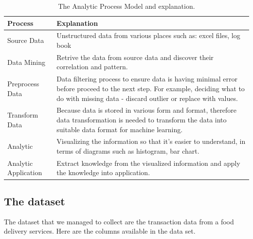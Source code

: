 \documentclass[journal]{IEEEtran}
\begin{document}
\begin{table}[!ht]
	\renewcommand{\arraystretch}{1.3}
	\setlength\extrarowheight{2.5pt}
	\caption{The Analytic Process Model and explanation.}
	\label{Analytic Proces Model}
	\centering	
\begin{tabular}{|l|>{\raggedright\arraybackslash}p{5cm}|}
	\hline 
	Process & Explanation \\ 
	\hline 
	Source Data & Unstructured data from various places such as: excel files, log book \\ 
	\hline 
	Data Mining & Retrive the data from source data and discover their correlation and pattern. \\ 
	\hline 
	Preprocess Data & Data filtering process to ensure data is having minimal error before proceed to the next step. For example, deciding what to do with missing data - discard outlier or replace with values. \\ 
	\hline 
	Transform Data & Because data is stored in various form and format, therefore data transformation is needed to transform the data into suitable data format for machine learning. \\ 
	\hline 
	Analytic & Visualizing the information so that it’s easier to understand, in terms of diagrams such as histogram, bar chart. \\ 
	\hline 
	Analytic Application & Extract knowledge from the visualized information and apply the knowledge into application. \\ 
	\hline 
\end{tabular} 
\end{table}

\subsection{The dataset}
The dataset that we managed to collect are the transaction data from a food delivery services. Here are the columns available in the data set.
\end{document}
